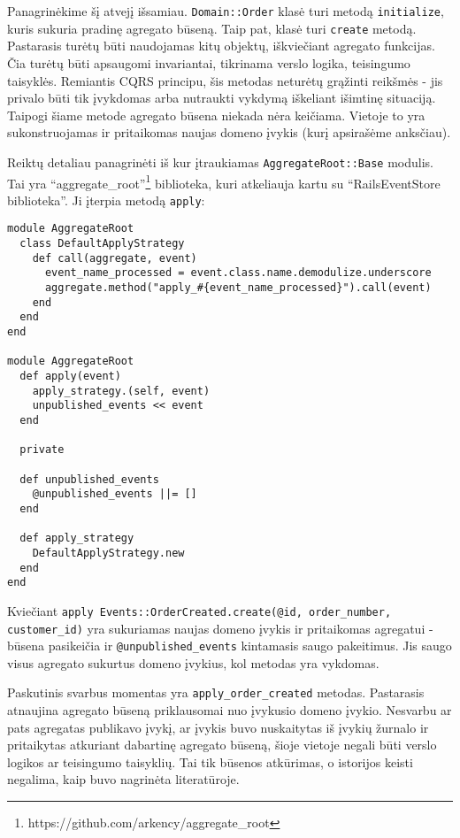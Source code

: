 Panagrinėkime šį atvejį išsamiau. \lstinline|Domain::Order| klasė turi metodą \lstinline|initialize|, kuris sukuria pradinę agregato būseną. Taip pat, klasė turi \lstinline|create| metodą. Pastarasis turėtų būti naudojamas kitų objektų, iškviečiant agregato funkcijas. Čia turėtų būti apsaugomi invariantai, tikrinama verslo logika, teisingumo taisyklės. Remiantis CQRS principu, šis metodas neturėtų grąžinti reikšmės - jis privalo būti tik įvykdomas arba nutraukti vykdymą iškeliant išimtinę situaciją. Taipogi šiame metode agregato būsena niekada nėra keičiama. Vietoje to yra sukonstruojamas ir pritaikomas naujas domeno įvykis (kurį apsirašėme anksčiau).

Reiktų detaliau panagrinėti iš kur įtraukiamas \lstinline|AggregateRoot::Base| modulis. Tai yra ``aggregate\_root''\footnote{https://github.com/arkency/aggregate\_root} biblioteka, kuri atkeliauja kartu su ``RailsEventStore biblioteka''. Ji įterpia metodą \lstinline|apply|:

\begin{lstlisting}
module AggregateRoot
  class DefaultApplyStrategy
    def call(aggregate, event)
      event_name_processed = event.class.name.demodulize.underscore
      aggregate.method("apply_#{event_name_processed}").call(event)
    end
  end
end

module AggregateRoot
  def apply(event)
    apply_strategy.(self, event)
    unpublished_events << event
  end

  private

  def unpublished_events
    @unpublished_events ||= []
  end

  def apply_strategy
    DefaultApplyStrategy.new
  end
end
\end{lstlisting}

Kviečiant \lstinline{apply Events::OrderCreated.create(@id, order_number, customer_id)} yra sukuriamas naujas domeno įvykis ir pritaikomas agregatui - būsena pasikeičia ir \lstinline|@unpublished_events| kintamasis saugo pakeitimus. Jis saugo visus agregato sukurtus domeno įvykius, kol metodas yra vykdomas.

Paskutinis svarbus momentas yra \lstinline|apply_order_created| metodas. Pastarasis atnaujina agregato būseną priklausomai nuo įvykusio domeno įvykio. Nesvarbu ar pats agregatas publikavo įvykį, ar įvykis buvo nuskaitytas iš įvykių žurnalo ir pritaikytas atkuriant dabartinę agregato būseną, šioje vietoje negali būti verslo logikos ar teisingumo taisyklių. Tai tik būsenos atkūrimas, o istorijos keisti negalima, kaip buvo nagrinėta literatūroje.

